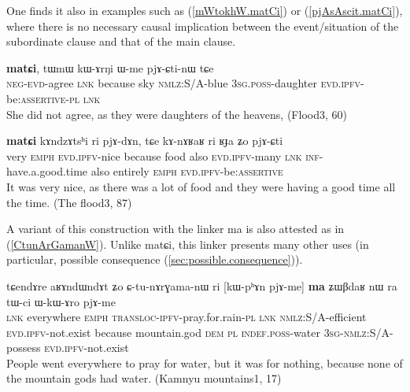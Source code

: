 \documentclass[oldfontcommands,oneside,a4paper,11pt]{article}
\newcommand{\ipa}[1]{{\phon \mbox{#1}}} %
\newcommand{\refb}[1]{(\ref{#1})}
\begin{document}


One finds it also in examples such as  \refb{mWtokhW.matCi} or \refb{pjAsAscit.matCi}, where there is no necessary causal implication between the event/situation of the subordinate clause and that of the main clause.
\begin{exe}
\ex \label{mWtokhW.matCi}
\gll 
[\ipa{mɯ-to-kʰɯ}]   	\ipa{qʰe}   	\ipa{\textbf{matɕi},}   	\ipa{tɯmɯ}   	\ipa{kɯ-ɤrŋi}   	\ipa{ɯ-me}   	\ipa{pjɤ-ɕti-nɯ}   	\ipa{tɕe}   \\
\textsc{neg-evd}-agree \textsc{lnk} because sky \textsc{nmlz}:S/A-blue \textsc{3sg.poss}-daughter \textsc{evd.ipfv}-be:\textsc{assertive-pl} \textsc{lnk} \\
\glt She did not agree, as they were daughters of the heavens, (Flood3, 60)
\end{exe}

\begin{exe}
\ex \label{pjAsAscit.matCi}
\gll 
[\ipa{wuma}  	\ipa{ʑo}  	\ipa{pjɤ-sɤscit}]  	\textbf{\ipa{matɕi}}  	\ipa{kɤndzɤtsʰi}  	\ipa{ri}  	\ipa{pjɤ-dɤn}, 	\ipa{tɕe}  	\ipa{kɤ-nɤʁaʁ}  	\ipa{ri}  	\ipa{ʁɟa}  	\ipa{ʑo}  	\ipa{pjɤ-ɕti}  \\
very \textsc{emph} \textsc{evd.ipfv}-nice because food also \textsc{evd.ipfv}-many \textsc{lnk} \textsc{inf}-have.a.good.time also entirely \textsc{emph} \textsc{evd.ipfv}-be:\textsc{assertive}
\\
\glt It was very nice, as there was a lot of food and they were having a good time all the time. (The flood3, 87)
\end{exe}


A variant of this construction with the  linker \ipa{ma} is also attested as in \refb{CtunArGamanW}. Unlike  \ipa{matɕi}, this linker presents many other uses (in particular, possible consequence \refb{sec:possible.consequence}).
 
\begin{exe}
\ex \label{CtunArGamanW}
\gll 
\ipa{tɕendɤre}   	\ipa{aʁɤndɯndɤt}   	\ipa{ʑo}   	\ipa{ɕ-tu-nɤrɣama-nɯ}   	\ipa{ri}   	[\ipa{kɯ-pʰɤn}   	\ipa{pjɤ-me}]   	\ipa{\textbf{ma}}   	\ipa{ʑɯβdaʁ}   	\ipa{nɯ} \ipa{ra}   	\ipa{tɯ-ci}   	\ipa{ɯ-kɯ-ɤro}   	\ipa{pjɤ-me} \\
\textsc{lnk} everywhere \textsc{emph} \textsc{transloc-ipfv}-pray.for.rain-\textsc{pl} \textsc{lnk} \textsc{nmlz}:S/A-efficient \textsc{evd.ipfv}-not.exist because mountain.god \textsc{dem} \textsc{pl} \textsc{indef.poss}-water \textsc{3sg-nmlz}:S/A-possess  \textsc{evd.ipfv}-not.exist  \\
 \glt People went everywhere to pray for water, but it was for nothing, because none of the mountain gods had water. (Kamnyu mountains1, 17)
\end{exe}
\end{document}
